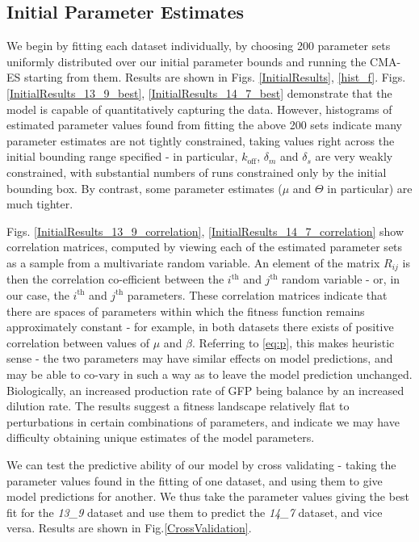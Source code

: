 \documentclass[10pt,journal]{./IEEE_latex_class/IEEEtran}
\begin{document}
\subsection{Initial Parameter Estimates}
\label{Initial Parameter Estimates}


 We begin by fitting each dataset individually, by choosing 200 parameter sets uniformly distributed over our initial parameter bounds and running the CMA-ES starting from them. Results are shown in Figs. \ref{InitialResults}, \ref{hist_f}. Figs. \ref{InitialResults_13_9_best}, \ref{InitialResults_14_7_best}  demonstrate that the model is capable of quantitatively capturing the data. However, histograms of estimated parameter values found from fitting the above 200 sets indicate many parameter estimates are not tightly constrained, taking values right across the initial bounding range specified - in particular, $k_\mathrm{off}$, $\delta_{m}$ and $\delta_{s}$ are very weakly constrained, with substantial numbers of runs constrained only by the initial bounding box. By contrast, some parameter estimates ($\mu$ and $\Theta$ in particular) are much tighter.


Figs. \ref{InitialResults_13_9_correlation}, \ref{InitialResults_14_7_correlation} show correlation matrices, computed by viewing each of the estimated parameter sets as a sample from a multivariate random variable. An element of the matrix $R_{ij}$ is then the correlation co-efficient between the $i^\mathrm{th}$ and $j^\mathrm{th}$ random variable - or, in our case, the $i^\mathrm{th}$ and $j^\mathrm{th}$ parameters. These correlation matrices indicate that there are spaces of parameters within which the fitness function remains approximately constant - for example, in both datasets there exists of positive correlation between values of $\mu$ and $\beta$. Referring to \eqref{eq:p}, this makes heuristic sense - the two parameters may have similar effects on model predictions, and may be able to co-vary in such a way as to leave the model prediction unchanged. Biologically, an increased production rate of GFP being balance by an increased dilution rate. 
The results suggest a fitness landscape relatively flat to perturbations in certain combinations of parameters, and indicate we may have difficulty obtaining unique estimates of the model parameters.
 
 We can test the predictive ability of our model by cross validating - taking the parameter values found in the fitting of one dataset, and using them to give model predictions for another. We thus take the parameter values giving the best fit for the  \textit{13\_9} dataset and use them to predict the \textit{14\_7} dataset, and vice versa. Results are shown in Fig.\ref{CrossValidation}.
 
\end{document}
